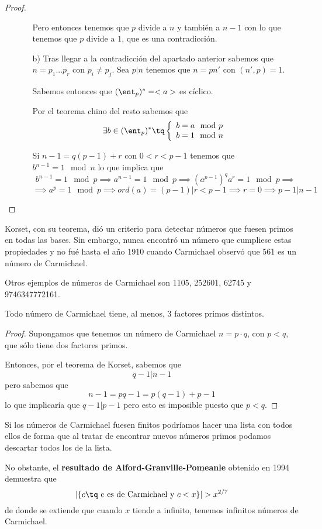 \begin{proof}
\begin{itemize}
\begin{itemize}
Pero entonces tenemos que $p$ divide a $n$ y también a $n-1$ con lo que tenemos que $p$ divide a $1$, que es una contradicción.

\item[b)]
Tras llegar a la contradicción del apartado anterior sabemos que $n=p_1...p_r$ con $p_i \neq p_j$. Sea $p | n$ tenemos que $n=pn'$ con $(n',p)=1$.

Sabemos entonces que $(\ent_p)^*=<a>$ es cíclico.

Por el teorema chino del resto sabemos que
\[\exists b \in (\ent_p)^* \tq \left\{\begin{array}{l}b=a\mod p \\ b=1 \mod n \end{array}\right.\]

Si $n-1 = q(p-1)+r$ con $0 < r < p-1$ tenemos que $b^{n-1}=1 \mod n$ lo que implica que
\[b^{n-1}=1 \mod p \implies a^{n-1} = 1 \mod p \implies (a^{p-1})^qa^r = 1 \mod p \implies\]
\[\implies a^p = 1 \mod p \implies ord(a) = (p-1)|r<p-1 \implies r=0\implies p-1 | n-1\]
\end{itemize}
\end{itemize}
\end{proof}

Korset, con su teorema, dió un criterio para detectar números que fuesen primos en todas las bases. Sin embargo, nunca encontró un número que cumpliese estas propiedades y no fué hasta el año 1910 cuando Carmichael observó que 561 es un número de Carmichael.

Otros ejemplos de números de Carmichael son 1105, 252601, 62745 y 9746347772161.

\begin{prop}
Todo número de Carmichael tiene, al menos, 3 factores primos distintos.
\end{prop}
\begin{proof}
Supongamos que tenemos un número de Carmichael $n=p\cdot q$, con $p<q$, que sólo tiene dos factores primos.

Entonces, por el teorema de Korset, sabemos que
\[q-1 | n-1\]
pero sabemos que
\[n-1 =pq-1=p(q-1)+p-1\]
lo que implicaría que $q-1|p-1$ pero esto es imposible puesto que $p<q$.
\end{proof}

Si los números de Carmichael fuesen finitos podríamos hacer una lista con todos ellos de forma que al tratar de encontrar nuevos números primos podamos descartar todos los de la lista.

No obstante, el \textbf{resultado de Alford-Granville-Pomeanle} obtenido en 1994 demuestra que
\[|\{c \tq \text{ c es de Carmichael y } c < x\}| > x^{2/7}\]
de donde se extiende que cuando $x$ tiende a infinito, tenemos infinitos números de Carmichael.


